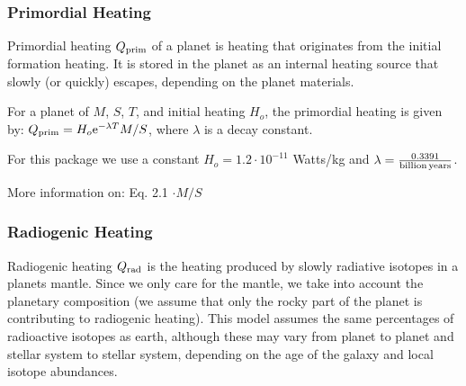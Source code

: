 \documentclass[letterpaper,10pt,english]{sphinxmanual}
\begin{document}
\subsubsection{Primordial Heating}
\label{\detokenize{quantities/surface/internal_heating/primordial_heating:primordial-heating}}\label{\detokenize{quantities/surface/internal_heating/primordial_heating::doc}}\label{\detokenize{quantities/surface/internal_heating/primordial_heating:id1}}
\sphinxAtStartPar
Primordial heating \(Q_{\rm prim}\) of a planet is heating that originates from the initial formation heating.
It is stored in the planet as an internal heating source that slowly (or quickly)
escapes, depending on the planet materials.

\sphinxAtStartPar
For a planet of {\hyperref[\detokenize{quantities/material/mass:id1}]{}} \(M\), {\hyperref[\detokenize{quantities/geometric/surface_area:id1}]{}} \(S\),
{\hyperref[\detokenize{quantities/life/age:id1}]{}} \(T\), and initial heating \(H_o\), the primordial heating is given by:
\(Q_{\rm prim} = H_o {\rm e}^{- \lambda T} M / S\), where \(\lambda\) is a decay constant.

\sphinxAtStartPar
For this package we use a constant \(H_o = 1.2 \cdot 10^{-11}\) Watts/kg and
\(\lambda = \frac{0.3391}{\rm billion\,years}\).

\sphinxAtStartPar
More information on:
 Eq. 2.1 \(\cdot M / S\)


\subsubsection{Radiogenic Heating}
\label{\detokenize{quantities/surface/internal_heating/radiogenic_heating:radiogenic-heating}}\label{\detokenize{quantities/surface/internal_heating/radiogenic_heating::doc}}\label{\detokenize{quantities/surface/internal_heating/radiogenic_heating:id1}}
\sphinxAtStartPar
Radiogenic heating \(Q_{\rm rad}\) is the heating produced by slowly radiative isotopes in a planets mantle.
Since we only care for the mantle, we take into account the planetary composition
(we assume that only the rocky part of the planet is contributing to radiogenic heating).
This model assumes the same percentages of radioactive isotopes as earth, although these may vary
from planet to planet and stellar system to stellar system, depending on the age of the galaxy
and local isotope abundances.
\end{document}
